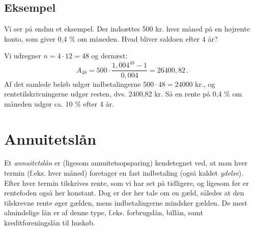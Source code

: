 \documentclass[12pt,oneside,a4paper]{article}
\begin{document}
\begin{tcolorbox}
\subsection*{Eksempel}
Vi ser på endnu et eksempel. Der indsættes 500 kr. hver måned på en højrente konto, som giver
0,4 $\%$ om måneden. Hvad bliver saldoen efter 4 år?

Vi udregner $n=4\cdot12 = 48$ og dernæst:
\[
A_{48} = 500\cdot\frac{1,004^{48}-1}{0,004} = 26400,82 \,.
\]
Af det samlede beløb udgør indbetalingerne $500\cdot 48 = 24000$ kr., og rentetilskrivningerne
udgør resten, dvs. 2400,82 kr. Så en rente på 0,4 $\%$ om måneden udgør ca. 10 $\%$ efter 4 år.

\end{tcolorbox}

\section{Annuitetslån}
Et \emph{annuitetslån} er (ligesom annuitetsopsparing) kendetegnet ved, at man
hver termin (f.eks. hver måned) foretager en fast indbetaling (også kaldet
\emph{ydelse}). Efter hver termin tilskrives rente, som vi har set på
tidligere, og ligesom før er rentefoden også her konstant. Dog er der her tale
om en gæld, således at den tilskrevne rente øger gælden, mens indbetalingerne
mindsker gælden.  De mest almindelige lån er af denne type, f.eks. forbrugslån,
billån, samt kreditforeningslån til huskøb.
\end{document}
